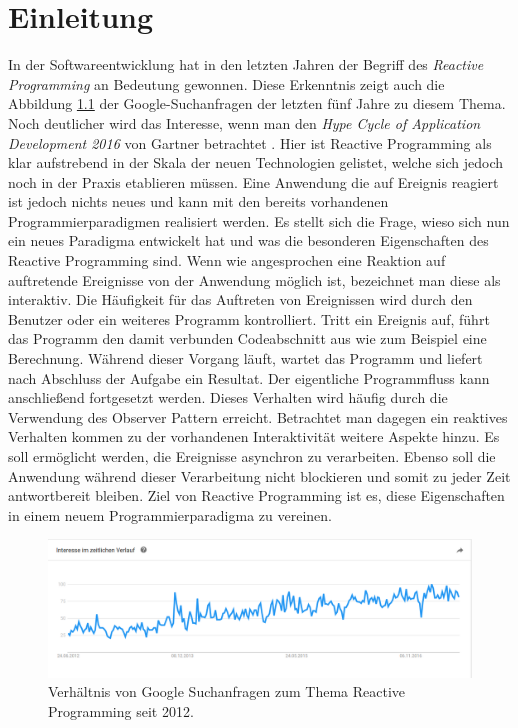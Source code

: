 \chapter{Einleitung}
\label{cha:einleitung}
In der Softwareentwicklung hat in den letzten Jahren der Begriff des \textit{Reactive Programming} an Bedeutung gewonnen. Diese Erkenntnis zeigt auch die Abbildung \ref{pic:googletrend} der Google-Suchanfragen der letzten fünf Jahre zu diesem Thema. Noch deutlicher wird das Interesse, wenn man den \textit{Hype Cycle of Application Development 2016} von Gartner betrachtet \cite{cycle}. Hier ist Reactive Programming als klar aufstrebend in der Skala der neuen Technologien gelistet, welche sich jedoch noch in der Praxis etablieren müssen. Eine Anwendung die auf Ereignis reagiert ist jedoch nichts neues und kann mit den bereits vorhandenen Programmierparadigmen realisiert werden. Es stellt sich die Frage, wieso sich nun ein neues Paradigma entwickelt hat und was die besonderen Eigenschaften des Reactive Programming sind. Wenn wie angesprochen eine Reaktion auf auftretende Ereignisse von der Anwendung möglich ist, bezeichnet man diese als interaktiv. Die Häufigkeit für das Auftreten von Ereignissen wird durch den Benutzer oder ein weiteres Programm kontrolliert. Tritt ein Ereignis auf, führt das Programm den damit verbunden Codeabschnitt aus wie zum Beispiel eine Berechnung. Während dieser Vorgang läuft, wartet das Programm und liefert nach Abschluss der Aufgabe ein Resultat. Der eigentliche Programmfluss kann anschließend fortgesetzt werden. Dieses Verhalten wird häufig durch die Verwendung des Observer Pattern erreicht. Betrachtet man dagegen ein reaktives Verhalten kommen zu der vorhandenen Interaktivität weitere Aspekte hinzu. Es soll ermöglicht werden, die Ereignisse asynchron zu verarbeiten. Ebenso soll die Anwendung während dieser Verarbeitung nicht blockieren und somit zu jeder Zeit antwortbereit bleiben. Ziel von Reactive Programming ist es, diese Eigenschaften in einem neuem Programmierparadigma zu vereinen.
\begin{figure}[hbt]
	\centering
	\includegraphics[width=1\textwidth]{Abb/rptrend}
	\caption{Verhältnis von Google Suchanfragen zum Thema Reactive Programming seit 2012.}
	\label{pic:googletrend}
\end{figure} \newpage
